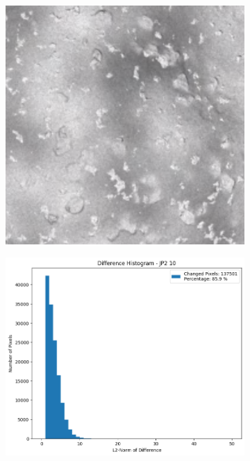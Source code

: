 \begin{figure}[htb]
    \centering
    \begin{subfigure}[b]{0.48\textwidth}
        \centering
        \includegraphics[width=\textwidth]{doc/thesis/0_figures/compare_quality/set1/jp2_10_center.png}
        \caption{}
        \label{fig:img_quality_comp_jp2_10_center_orig}
    \end{subfigure}
    \begin{subfigure}[b]{0.48\textwidth}
        \centering
        \includegraphics[width=\textwidth]{doc/thesis/0_figures/compare_quality/set1/jp2_10_center_diff_histogram.png}

\end{subfigure}
\end{figure}
